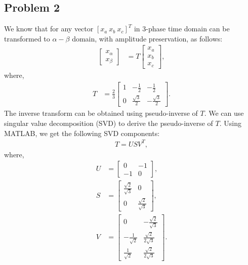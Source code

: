 \subsection*{Problem 2}
We know that for any vector $[x_a\ x_b\ x_c]^T$ in $3$-phase time domain can be transformed to $\alpha-\beta$ domain, with amplitude preservation, as follows:
\begin{align*}
	\begin{bmatrix}
		x_{\alpha}\\x_{\beta}
	\end{bmatrix}&= T\begin{bmatrix}
	x_a\\x_b\\x_c
	\end{bmatrix},
\end{align*}
where,
\begin{align*}
	T &= \frac{2}{3}\begin{bmatrix}
		1 & -\frac{1}{2} & -\frac{1}{2}\\
		0 & \frac{\sqrt{3}}{2} & -\frac{\sqrt{3}}{2}
	\end{bmatrix}.
\end{align*}
The inverse transform can be obtained using pseudo-inverse of $T$. We can use singular value decomposition (SVD) to derive the pseudo-inverse of $T$. Using MATLAB, we get the following SVD components:
\begin{align*}
	T = USV^T,
\end{align*}
where,
\begin{align*}
	U &= \begin{bmatrix}
		0 & -1\\-1 & 0
	\end{bmatrix},\\
	S &= \begin{bmatrix}
		\frac{\sqrt{2}}{\sqrt{3}} & 0\\0 & \frac{\sqrt{2}}{\sqrt{3}}
	\end{bmatrix},\\
	V &= \begin{bmatrix}
		0 & -\frac{\sqrt{2}}{\sqrt{3}}\\
		-\frac{1}{\sqrt{2}} & \frac{\sqrt{2}}{2\sqrt{3}}\\
		\frac{1}{\sqrt{2}} & \frac{\sqrt{2}}{2\sqrt{3}}
	\end{bmatrix}.
\end{align*}
